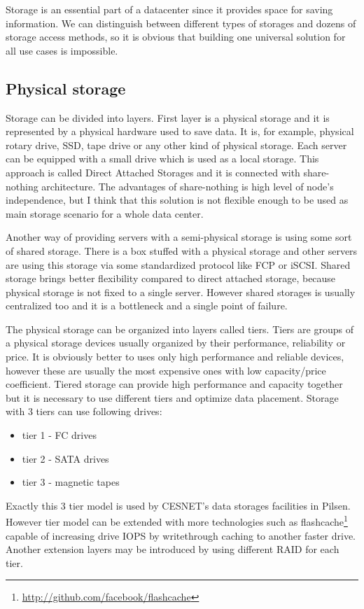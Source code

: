 

Storage is an essential part of a datacenter since it provides space for saving information. We can distinguish between different types of storages and dozens of storage access methods, so it is obvious that building one universal solution for all use cases is impossible. 

\subsection{Physical storage}
Storage can be divided into layers. First layer is a physical storage and it is represented by a physical hardware used to save data. It is, for example, physical rotary drive, \Ac{SSD}, tape drive or any other kind of physical storage. Each server can be equipped with a small drive which is used as a local storage. This approach is called Direct Attached Storages and it is connected with share-nothing architecture. The advantages of share-nothing is high level of node's independence, but I think that this solution is not flexible enough to be used as main storage scenario for a whole data center.

Another way of providing servers with a semi-physical storage is using some sort of shared storage. There is a box stuffed with a physical storage and other servers are using this storage via some standardized protocol like \Ac{FCP} or \Ac{iSCSI}. Shared storage brings better flexibility compared to direct attached storage, because physical storage is not fixed to a single server. However shared storages is usually centralized too and it is a bottleneck and a single point of failure.

The physical storage can be organized into layers called tiers. Tiers are groups of a physical storage devices usually organized by their performance, reliability or price. It is obviously better to uses only high performance and reliable devices, however these are usually the most expensive ones with low capacity/price coefficient. Tiered storage can provide high performance and capacity together but it is necessary to use different tiers and optimize data placement. Storage with 3 tiers can use following drives:
\begin{itemize}
	\item tier 1 - \Ac{FC} drives
	\item tier 2 - \Ac{SATA} drives
	\item tier 3 - magnetic tapes
\end{itemize}
Exactly this 3 tier model is used by CESNET's data storages facilities in Pilsen. However tier model can be extended with more technologies such as flashcache\footnote{\url{http://github.com/facebook/flashcache}} capable of increasing drive \Ac{IOPS} by writethrough caching to another faster drive. Another extension layers may be introduced by using different \Ac{RAID} for each tier.

